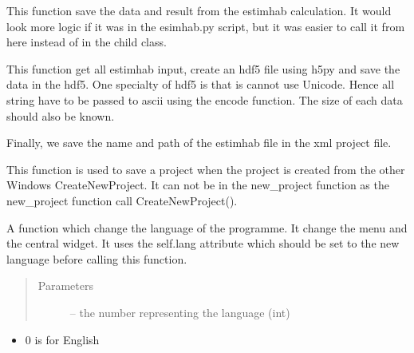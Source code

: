 \documentclass[letterpaper,10pt,english]{sphinxmanual}
\begin{document}
\begin{fulllineitems}
\begin{fulllineitems}

This function save the data and result from the estimhab calculation. It would look more logic if it was in
the esimhab.py script, but it was easier to call it from here instead of in the child class.

This function get all estimhab input, create an hdf5 file using h5py and save the data in the hdf5. One
specialty of hdf5 is that is cannot use Unicode. Hence all string have to be passed to ascii using the encode
function. The size of each data should also be known.

Finally, we save the name and path of the estimhab file in the xml project file.

\end{fulllineitems}


\begin{fulllineitems}
\label{\detokenize{index:src_GUI.Main_windows_1.MainWindows.save_project_if_new_project}}
This function is used to save a project when the project is created from the other Windows CreateNewProject. It
can not be in the new\_project function as the new\_project function call CreateNewProject().

\end{fulllineitems}


\begin{fulllineitems}
\label{\detokenize{index:src_GUI.Main_windows_1.MainWindows.setlangue}}
A function which change the language of the programme. It change the menu and the central widget.
It uses the self.lang attribute which should be set to the new language before calling this function.
\begin{quote}\begin{description}
\item[{Parameters}] \leavevmode
{} -- the number representing the language (int)

\end{description}\end{quote}
\begin{itemize}
\item {} 
0 is for English


\end{itemize}
\end{fulllineitems}
\end{fulllineitems}
\end{document}
